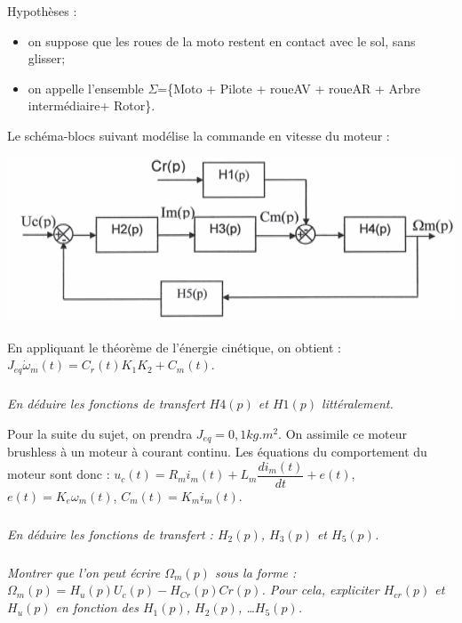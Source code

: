 \documentclass[10pt,fleqn]{article} %
\begin{document}
\begin{multicols}{2}
Hypothèses :
\begin{itemize}
\item on suppose que les roues de la moto restent en contact avec le sol, sans glisser;
\item on appelle l’ensemble $ \Sigma$=\{Moto + Pilote + roueAV + roueAR + Arbre intermédiaire+ Rotor\}.
\end{itemize}
Le schéma-blocs suivant modélise la commande en vitesse du moteur :
\begin{center}
	\includegraphics[width=.9\linewidth]{images/fig_06}
\end{center}


En appliquant le théorème de l'énergie cinétique, on obtient : $J_{eq}\dot{\omega}_m(t)=C_r(t) K_1 K_2 + C_m(t)$.

\subparagraph{}
\textit{En déduire les fonctions de transfert $H4(p)$ et $H1(p)$ littéralement.}
\ifprof
\begin{corrige}
\end{corrige}
\else
\fi

Pour la suite du sujet, on prendra $J_{eq} = {0,1}{kg.m^2}$. On assimile ce moteur brushless à un moteur à courant continu. Les équations du comportement du moteur
sont donc :
$u_c(t) =  R_m i_m(t) + L_m \dfrac{di_m(t)}{dt} + e(t)$, $e (t)= K_e \omega_m (t)$, 
$C_m(t) = K_mi_m(t)$.



\subparagraph{}
\textit{En déduire les fonctions de transfert : $H_2(p)$, $H_3(p)$ et $H_5(p)$.}
\ifprof
\begin{corrige}
\end{corrige}
\else
\fi


\subparagraph{}
\textit{Montrer que l’on peut écrire  $\Omega_m(p)$ sous la forme :
$\Omega_m(p)=H_u(p)U_c(p)-H_{Cr}(p)Cr(p)$.
Pour cela, expliciter $H_{cr}(p)$ et $H_u(p)$ en fonction des $H_1(p)$, $H_2(p)$, …$H_5(p)$.
}
\ifprof
\begin{corrige}
\end{corrige}
\else
\fi



\end{multicols}
\end{document}
